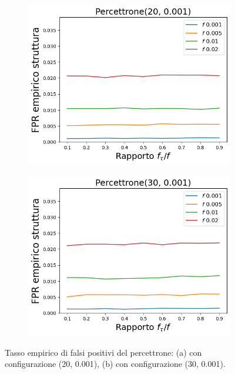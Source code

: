 \documentclass[../../main.tex]{subfiles}
\begin{document}
    \begin{figure}[H]
        \begin{subfigure}[b]{0.49\textwidth}
            \centering
            \includegraphics[width = \textwidth]{immagini/7/LBF/Percettrone(20, 0.001)_FPR.png}
            \caption{}
            \label{fig:LBFFPRPercettrone20}
        \end{subfigure}
        \begin{subfigure}[b]{0.49\textwidth}
            \centering
            \includegraphics[width = \textwidth]{immagini/7/LBF/Percettrone(30, 0.001)_FPR.png}
            \caption{}
            \label{fig:LBFFPRPercettrone30}
        \end{subfigure}
        \caption{Tasso empirico di falsi positivi del percettrone: (a) con configurazione (20, 0.001), (b) con configurazione (30, 0.001).}
        \label{fig:LBFFPRPercettrone}
    \end{figure}
\end{document}
